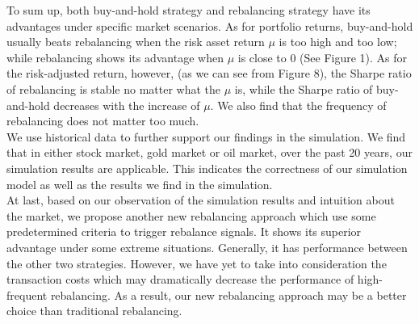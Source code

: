 \documentclass[
10pt, %
a4paper, %
oneside, %
headinclude,footinclude, %
BCOR5mm, %
]{scrartcl}
\begin{document}
To sum up, both buy-and-hold strategy and rebalancing strategy have its advantages under specific market scenarios. As for portfolio returns, buy-and-hold usually beats rebalancing when the risk asset return $\mu$ is too high and too low; while rebalancing shows its advantage when $\mu$ is close to 0 (See Figure 1). As for the risk-adjusted return, however, (as we can see from Figure 8), the Sharpe ratio of rebalancing is stable no matter what the $\mu$ is, while the Sharpe ratio of buy-and-hold decreases with the increase of $\mu$. We also find that the frequency of rebalancing does not matter too much.\\

We use historical data to further support our findings in the simulation. We find that in either stock market, gold market or oil market, over the past 20 years, our simulation results are applicable. This indicates the correctness of our simulation model as well as the results we find in the simulation.\\

At last, based on our observation of the simulation results and intuition about the market, we propose another new rebalancing approach which use some predetermined criteria to trigger rebalance signals. It shows its superior advantage under some extreme situations. Generally, it has performance between the other two strategies. However, we have yet to take into consideration the transaction costs which may dramatically decrease the performance of high-frequent rebalancing. As a result, our new rebalancing approach may be a better choice than traditional rebalancing. 







\renewcommand{\refname}{\spacedlowsmallcaps{References}} %






\end{document}
